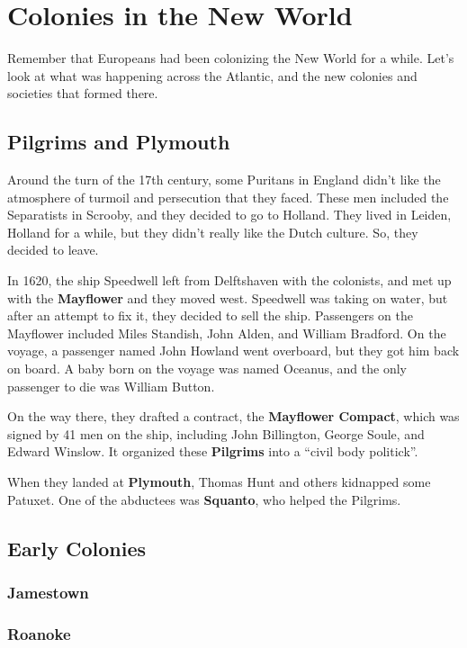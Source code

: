 \chapter{Colonies in the New World}

Remember that Europeans had been colonizing the New World for a while.
Let's look at what was happening across the Atlantic,
and the new colonies and societies that formed there.

\section{Pilgrims and Plymouth}

Around the turn of the 17th century,
some Puritans in England didn't like the atmosphere of turmoil and persecution that they faced.
These men included the Separatists in Scrooby, and they decided to go to Holland.
They lived in Leiden, Holland for a while, but they didn't really like the Dutch culture.
So, they decided to leave.

In 1620, the ship Speedwell left from Delftshaven with the colonists,
and met up with the \textbf{Mayflower} and they moved west.
Speedwell was taking on water, but after an attempt to fix it, they decided to sell the ship.
Passengers on the Mayflower included Miles Standish, John Alden, and William Bradford.
On the voyage, a passenger named John Howland went overboard, but they got him back on board.
A baby born on the voyage was named Oceanus, and the only passenger to die was William Button.

On the way there, they drafted a contract, the \textbf{Mayflower Compact},
which was signed by 41 men on the ship, including John Billington, George Soule, and Edward Winslow.
It organized these \textbf{Pilgrims} into a ``civil body politick''.

When they landed at \textbf{Plymouth}, Thomas Hunt and others kidnapped some Patuxet.
One of the abductees was \textbf{Squanto}, who helped the Pilgrims.

\section{Early Colonies}

\subsection*{Jamestown}

\subsection*{Roanoke}


